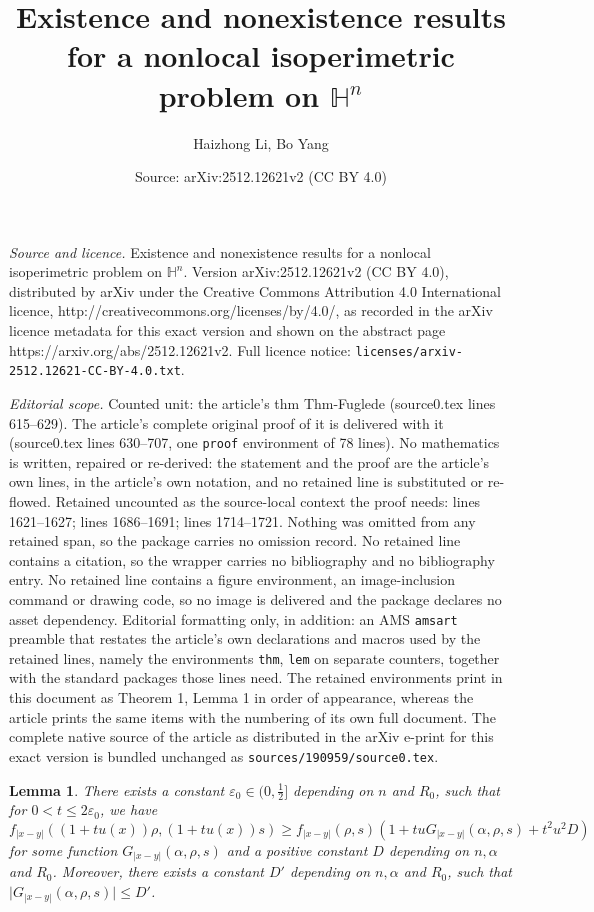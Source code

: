 \documentclass[10pt,a4paper]{amsart}
\title{Existence and nonexistence results for a nonlocal isoperimetric problem on $\mathbb{H}^n$}
\author{Haizhong Li, Bo Yang}
\date{Source: arXiv:2512.12621v2 (CC BY 4.0)}
\newtheorem{lem}{Lemma}
\begin{document}
\maketitle

\noindent\emph{Source and licence.} Existence and nonexistence results for a nonlocal isoperimetric problem on $\mathbb{H}^n$. Version arXiv:2512.12621v2 (CC BY 4.0), distributed by arXiv under the Creative Commons Attribution 4.0 International licence, http://creativecommons.org/licenses/by/4.0/, as recorded in the arXiv licence metadata for this exact version and shown on the abstract page https://arxiv.org/abs/2512.12621v2. Full licence notice: \texttt{licenses/arxiv-2512.12621-CC-BY-4.0.txt}.\par\smallskip

\noindent\textit{Editorial scope.} Counted unit: the article's thm Thm-Fuglede (source0.tex lines 615--629). The article's complete original proof of it is delivered with it (source0.tex lines 630--707, one \texttt{proof} environment of 78 lines). No mathematics is written, repaired or re-derived: the statement and the proof are the article's own lines, in the article's own notation, and no retained line is substituted or re-flowed.  Retained uncounted as the source-local context the proof needs: lines 1621--1627; lines 1686--1691; lines 1714--1721.  Nothing was omitted from any retained span, so the package carries no omission record.  No retained line contains a citation, so the wrapper carries no bibliography and no bibliography entry.  No retained line contains a figure environment, an image-inclusion command or drawing code, so no image is delivered and the package declares no asset dependency.  Editorial formatting only, in addition: an AMS \texttt{amsart} preamble that restates the article's own declarations and macros used by the retained lines, namely the environments \texttt{thm}, \texttt{lem} on separate counters, together with the standard packages those lines need.  The retained environments print in this document as Theorem 1, Lemma 1 in order of appearance, whereas the article prints the same items with the numbering of its own full document.  The complete native source of the article as distributed in the arXiv e-print for this exact version is bundled unchanged as \texttt{sources/190959/source0.tex}.
\begin{lem}\label{Lem-appen--1}
	There exists a constant $\varepsilon_0\in(0,\frac{1}{2}]$ depending on $n$ and $R_0$, such that for $0<t\leq 2\varepsilon_0$,  we have
	\begin{equation}\label{Eq-a5}
	f_{|x-y|}\left((1+tu(x))\rho,(1+tu(x))s\right)\geq f_{|x-y|}(\rho,s)\left(1+tuG_{|x-y|}(\alpha,\rho,s)+t^2u^2D\right)
	\end{equation}
	for some function $G_{|x-y|}(\alpha,\rho,s)$ and a positive constant $D$ depending on $n,\alpha$ and $R_0$. Moreover, there exists a constant $D'$ depending on $n,\alpha$ and $R_0$, such that $\big|G_{|x-y|}(\alpha,\rho,s)\big|\leq D'$.
\end{lem}
\end{document}
